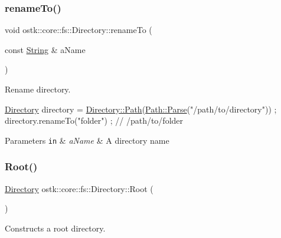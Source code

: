 \subsubsection{\texorpdfstring{rename\+To()}{renameTo()}}
{\footnotesize\ttfamily void ostk\+::core\+::fs\+::\+Directory\+::rename\+To (\begin{DoxyParamCaption}\item[{const \hyperlink{classostk_1_1core_1_1types_1_1_string}{String} \&}]{a\+Name }\end{DoxyParamCaption})}



Rename directory. 


\begin{DoxyCode}
\hyperlink{classostk_1_1core_1_1fs_1_1_directory_adc893e10f55282be0d0455e9cfc5796b}{Directory} directory = \hyperlink{classostk_1_1core_1_1fs_1_1_directory_a0151dba2940d5f426b52209dc7dab2e5}{Directory::Path}(\hyperlink{classostk_1_1core_1_1fs_1_1_path_ad08539ba654f5df11c4bcb07276345ad}{Path::Parse}(\textcolor{stringliteral}{"/path/to/directory"}))
       ;
directory.renameTo(\textcolor{stringliteral}{"folder"}) ; \textcolor{comment}{// /path/to/folder}
\end{DoxyCode}



\begin{DoxyParams}[1]{Parameters}
\mbox{\tt in}  & {\em a\+Name} & A directory name \\
\hline
\end{DoxyParams}
\mbox{\label{classostk_1_1core_1_1fs_1_1_directory_a0e6db71e5632f6b0ea4ad3fabd4c00db}} 
\subsubsection{\texorpdfstring{Root()}{Root()}}
{\footnotesize\ttfamily \hyperlink{classostk_1_1core_1_1fs_1_1_directory}{Directory} ostk\+::core\+::fs\+::\+Directory\+::\+Root (\begin{DoxyParamCaption}{ }\end{DoxyParamCaption})\hspace{0.3cm}{\ttfamily [static]}}



Constructs a root directory. 


